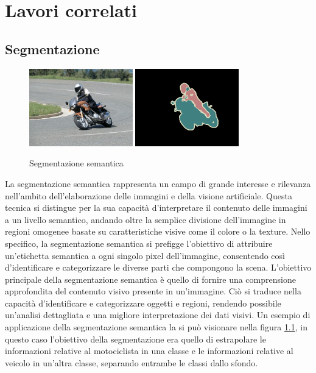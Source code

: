 
\chapter{Lavori correlati} \label{chap:related_works}
\section{Segmentazione} \label{sec:segmentazione} 

\begin{figure}[h!]
  \begin{center}
    \includegraphics[width=0.4\textwidth]{Immagini/segmantion_example_image.png}
    \includegraphics[width=0.4\textwidth]{Immagini/segmantion_example_mask.png}
  \end{center}
  \caption{Segmentazione semantica}
  \label{fig:segmentazione}
\end{figure}

La segmentazione semantica rappresenta un campo di grande interesse e rilevanza
nell'ambito dell'elaborazione delle immagini e della visione artificiale. Questa
tecnica si distingue per la sua capacità d'interpretare il contenuto delle
immagini a un livello semantico, andando oltre la semplice divisione
dell'immagine in regioni omogenee basate su caratteristiche visive come il
colore o la texture. Nello specifico, la segmentazione semantica si prefigge
l'obiettivo di attribuire un'etichetta semantica a ogni singolo pixel
dell'immagine, consentendo così d'identificare e categorizzare le diverse parti
che compongono la scena.  L'obiettivo principale della segmentazione semantica è
quello di fornire una comprensione approfondita del contenuto visivo presente in
un'immagine. Ciò si traduce nella capacità d'identificare e categorizzare
oggetti e regioni, rendendo possibile un'analisi dettagliata e una migliore
interpretazione dei dati visivi.
Un esempio di applicazione della segmentazione semantica la si pu\`o visionare
nella figura \ref{fig:segmentazione}, in questo caso l'obiettivo della segmentazione era quello di 
estrapolare le informazioni relative al motociclista in una classe e le informazioni relative 
al veicolo in un'altra classe, separando entrambe le classi dallo sfondo.



